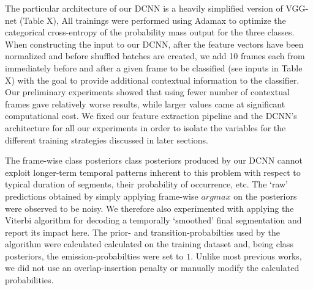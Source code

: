 \documentclass[a4paper]{article}
\begin{document}
The particular architecture of our DCNN is a heavily simplified version of VGG-net (Table X),  %
All trainings were performed using Adamax to optimize the categorical cross-entropy of the probability mass output for the three classes.
When constructing the input to our DCNN,
after the feature vectors have been normalized and before shuffled batches are created,
we add 10 frames each from immediately before and after a given frame to be classified (see inputs in Table X)  %
with the goal to provide additional contextual information to the classifier.
Our preliminary experiments showed that using fewer number of contextual frames gave relatively worse results,
while larger values came at significant computational cost.
We fixed our feature extraction pipeline and the DCNN's architecture for all our experiments in order to isolate the variables for the different training strategies discussed in later sections.

The frame-wise class posteriors class posteriors produced by our DCNN cannot exploit longer-term temporal patterns inherent to this problem with respect to typical duration of segments,
their probability of occurrence, etc.
The `raw' predictions obtained by simply applying frame-wise $argmax$ on the posteriors were observed to be noisy.
We therefore also experimented with applying the Viterbi algorithm \cite{rabiner_tutorial_1989} for decoding a temporally `smoothed' final segmentation and report its impact here.
The prior- and transition-probabilties used by the algorithm were calculated calculated on the training dataset and,
being class posteriors, the emission-probabilties were set to $1$.
Unlike most previous works,  %
we did not use an overlap-insertion penalty or manually modify the calculated probabilities.
\end{document}
